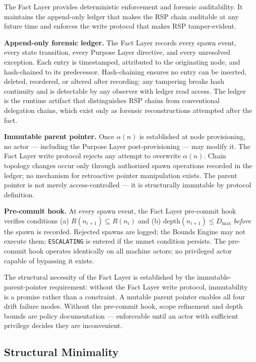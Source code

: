 The Fact Layer provides deterministic enforcement and forensic auditability. It maintains the append-only ledger that makes the RSP chain auditable at any future time and enforces the write protocol that makes RSP tamper-evident.

\medskip
\noindent\textbf{Append-only forensic ledger.} The Fact Layer records every spawn event, every state transition, every Purpose Layer directive, and every unresolved exception. Each entry is timestamped, attributed to the originating node, and hash-chained to its predecessor. Hash-chaining ensures no entry can be inserted, deleted, reordered, or altered after recording: any tampering breaks hash continuity and is detectable by any observer with ledger read access. The ledger is the runtime artifact that distinguishes RSP chains from conventional delegation chains, which exist only as forensic reconstructions attempted after the fact.

\medskip
\noindent\textbf{Immutable parent pointer.} Once $\alpha(n)$ is established at node provisioning, no actor — including the Purpose Layer post-provisioning — may modify it. The Fact Layer write protocol rejects any attempt to overwrite $\alpha(n)$. Chain topology changes occur only through authorized spawn operations recorded in the ledger; no mechanism for retroactive pointer manipulation exists. The parent pointer is not merely access-controlled — it is structurally immutable by protocol definition.

\medskip
\noindent\textbf{Pre-commit hook.} At every spawn event, the Fact Layer pre-commit hook verifies conditions (a) $R(n_{i+1}) \subseteq R(n_i)$ and (b) $\mathrm{depth}(n_{i+1}) \leq D_{\mathrm{max}}$ \emph{before} the spawn is recorded. Rejected spawns are logged; the Bounds Engine may not execute them; \texttt{ESCALATING} is entered if the unmet condition persists. The pre-commit hook operates identically on all machine actors; no privileged actor capable of bypassing it exists.

The structural necessity of the Fact Layer is established by the immutable-parent-pointer requirement: without the Fact Layer write protocol, immutability is a promise rather than a constraint. A mutable parent pointer enables all four drift failure modes. Without the pre-commit hook, scope refinement and depth bounds are policy documentation — enforceable until an actor with sufficient privilege decides they are inconvenient.

\subsection{Structural Minimality}
\label{sec:rs-minimality}

